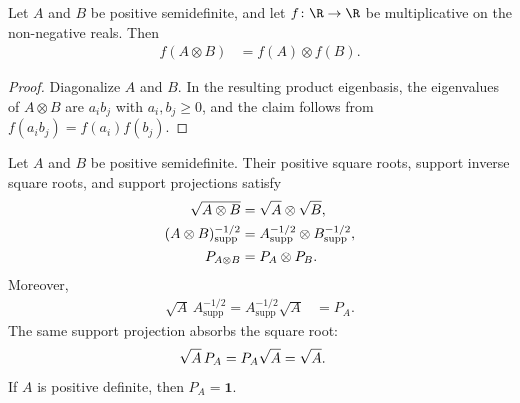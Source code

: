 \begin{theorem}
    \label{thm:multiplicative_functional_calculus_tensor_product}
    \leanok
    Let $A$ and $B$ be positive semidefinite, and let $f\colon\R\to\R$ be
    multiplicative on the non-negative reals. Then
    \begin{align}
        f(A\otimes B)&=f(A)\otimes f(B).
        \label{eq:entropy_cfc_tensor_product}
    \end{align}
\end{theorem}

\begin{proof}\leanok
    Diagonalize $A$ and $B$. In the resulting product eigenbasis, the
    eigenvalues of $A\otimes B$ are $a_i b_j$ with $a_i,b_j\geq 0$, and the
    claim follows from $f(a_i b_j)=f(a_i)f(b_j)$.
\end{proof}

\begin{theorem}
    \label{thm:support_inverse_square_root_tensor_product}
    \leanok
    Let $A$ and $B$ be positive semidefinite. Their positive square roots,
    support inverse square roots, and support projections satisfy
    \begin{align}
        \sqrt{A\otimes B}
        &=\sqrt A\otimes\sqrt B,
        \notag\\
        (A\otimes B)^{-1/2}_{\mathrm{supp}}
        &=A^{-1/2}_{\mathrm{supp}}\otimes B^{-1/2}_{\mathrm{supp}},
        \notag\\
        P_{A\otimes B}
        &=P_A\otimes P_B.
        \label{eq:entropy_support_tensor_product}
    \end{align}
    Moreover,
    \begin{align}
        \sqrt A\,A^{-1/2}_{\mathrm{supp}}
        =A^{-1/2}_{\mathrm{supp}}\sqrt A
        &=P_A.
        \label{eq:entropy_support_sqrt_cancellation}
    \end{align}
    The same support projection absorbs the square root:
    \begin{align}
        \sqrt A\,P_A=P_A\sqrt A&=\sqrt A.
        \notag
    \end{align}
    If $A$ is positive definite, then $P_A=\mathbf 1$.
\end{theorem}

